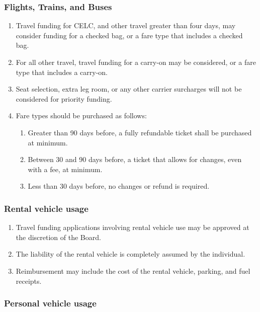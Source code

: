 \subsubsection{Flights, Trains, and Buses}
\label{flights-trains-and-buses}

\begin{enumerate}
 \item
  Travel funding for CELC, and other travel greater than four days, may consider funding for a checked bag, or a fare type that includes a checked bag.
 \item
  For all other travel, travel funding for a carry-on may be considered, or a fare type that includes a carry-on.
 \item
  Seat selection, extra leg room, or any other carrier surcharges will not be considered for priority funding.
 \item
  Fare types should be purchased as follows:

  \begin{enumerate}
   \item
    Greater than 90 days before, a fully refundable ticket shall be purchased at minimum.
   \item
    Between 30 and 90 days before, a ticket that allows for changes, even with a fee, at minimum.
   \item
    Less than 30 days before, no changes or refund is required.
  \end{enumerate}
\end{enumerate}

\subsubsection{Rental vehicle usage}
\label{rental-vehicle-usage}

\begin{enumerate}
 \item
  Travel funding applications involving rental vehicle use may be approved at the discretion of the Board.
 \item
  The liability of the rental vehicle is completely assumed by the individual.
 \item
  Reimbursement may include the cost of the rental vehicle, parking, and fuel receipts.
\end{enumerate}

\subsubsection{Personal vehicle usage}
\label{personal-vehicle-usage}

